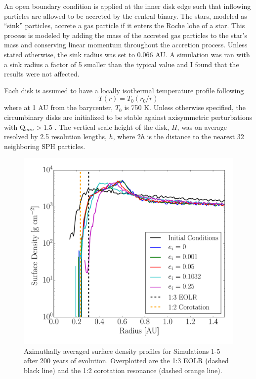 An open boundary condition is applied at the inner disk edge such that inflowing particles are allowed to be accreted
by the central binary.  The stars, modeled as ``sink'' particles, accrete a gas particle if it enters the Roche lobe of a star.  This process is modeled by adding the mass of the accreted gas particles to the star's mass and conserving linear momentum throughout the accretion process.  Unless stated otherwise, the 
sink radius was set to 0.066 AU.  A simulation was ran with a sink radius a factor of 5 smaller than the typical value and I found that the results were not 
affected.
 
Each disk is assumed to have a locally isothermal temperature profile following 
\begin{equation}
\label{CBDisk:eqn:disc_temp_profile}
T(r) = T_0(r_0/r)
\end{equation}
where at 1 AU from the barycenter, $T_0$ is
750 K.  Unless otherwise specified, the circumbinary disks are initialized to be stable against axisymmetric perturbations with Q$_{min} > 1.5$ \citep{Toomre1964}.
The vertical scale height of the disk, $H$, was on average resolved by
  2.5 resolution lengths, $h$, where $2 h$ is the distance
to the nearest 32 neighboring SPH particles.

\begin{figure}
	\includegraphics[width=\columnwidth]{f1}
    \caption{Azimuthally averaged surface density profiles for Simulations 1-5 after 200 years of evolution.  Overplotted are the 1:3 EOLR (dashed black line) and the 1:2 corotation resonance (dashed orange line).}
    \label{fig:CBDiskSurfaceDensity}
\end{figure}

